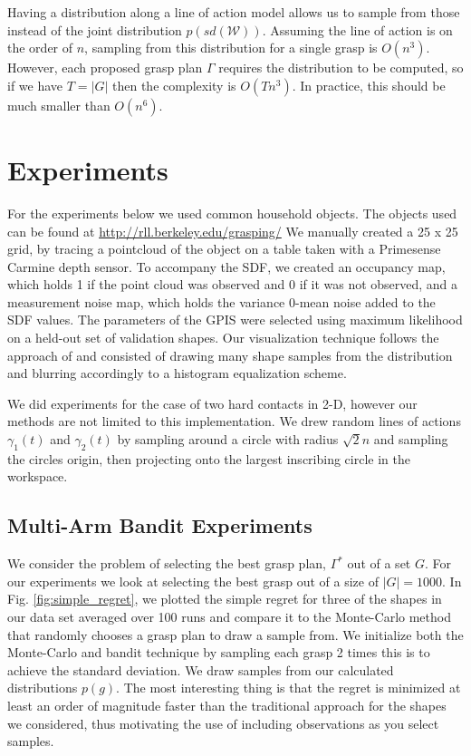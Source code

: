 \documentclass[letterpaper, 10 pt, conference]{ieeeconf}  %
\begin{document}
Having a distribution along a line of action model allows us to sample from those instead of the joint distribution $p(sd(\mathcal{W}))$. Assuming the line of action is on the order of $n$, sampling from this distribution for a single grasp is $O(n^3)$. However, each proposed grasp plan $\Gamma$ requires the distribution to be computed, so if we have $T=|G|$ then the complexity is $O(Tn^3)$. In practice, this should be much smaller than $O(n^6)$. 




\section{Experiments}
For the experiments below we used common household objects.  The objects used can be found at \url{http://rll.berkeley.edu/grasping/} We manually created a 25 x 25 grid, by tracing a pointcloud of the object on a table taken with a Primesense Carmine depth sensor. To accompany the SDF, we created an occupancy map, which holds 1 if the point cloud was observed and 0 if it was not observed, and a measurement noise map, which holds the variance 0-mean noise added to the SDF values. The parameters of the GPIS were selected using maximum likelihood on a held-out set of validation shapes. Our visualization technique follows the approach of \cite{mahler2015opt} and consisted of drawing many shape samples from the distribution and blurring accordingly to a histogram equalization scheme. 

We did experiments for the case of two hard contacts in 2-D, however our methods are not limited to this implementation. We drew random lines of actions $\gamma_1(t)$ and $\gamma_2(t)$ by sampling around a circle with radius $\sqrt{2}n$ and sampling the circles origin, then projecting onto the largest inscribing circle in the workspace. 





\subsection{Multi-Arm Bandit Experiments}

We consider the problem of selecting the best grasp plan, $\Gamma^*$ out of a set $G$. For our experiments we look at selecting the best grasp out of a size of $|G| = 1000$. In Fig. \ref{fig:simple_regret}, we plotted the simple regret for three of the shapes in our data set averaged over 100 runs and compare it to the Monte-Carlo method that randomly chooses a grasp plan to draw a sample from. We initialize both the Monte-Carlo and bandit technique by sampling each grasp 2 times this is to achieve the standard deviation. We draw samples from our calculated distributions $p(g)$.  The most interesting thing is that the regret is minimized at least an order of magnitude faster than the traditional approach for the shapes we considered, thus motivating the use of including observations as you select samples. 
\end{document}
